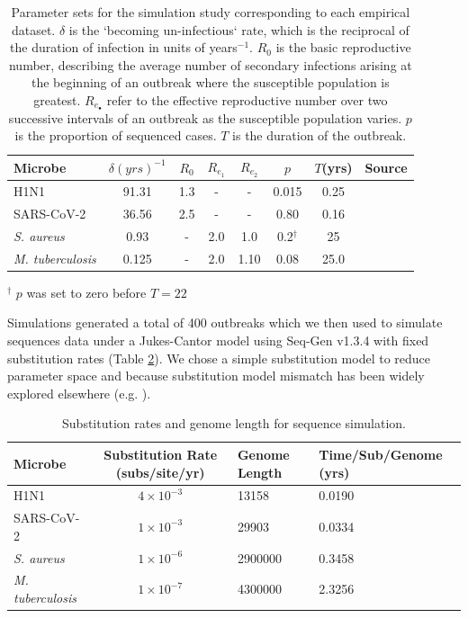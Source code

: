 \documentclass[12pt]{article}
\begin{document}
\begin{spacing}{2}
\begin{table}[H]
    \centering
    \caption{Parameter sets for the simulation study corresponding to each empirical dataset. $\delta$ is the `becoming un-infectious` rate, which is the reciprocal of the duration of infection in units of years$^{-1}$. $R_0$ is the basic reproductive number, describing the average number of secondary infections arising at the beginning of an outbreak where the susceptible population is greatest. $R_{e_\bullet}$ refer to the effective reproductive number over two successive intervals of an outbreak as the susceptible population varies. $p$ is the proportion of sequenced cases. $T$ is the duration of the outbreak.}
    \begin{tabular}{lccccccl}
    \toprule
    Microbe                     &   $\delta (yrs)^{-1}$    & $R_0$ &   $R_{e_1}$   &  $R_{e_2}$    &   $p$   &   $T$(yrs)   & Source \\
    \midrule
    H1N1                        &   91.31    & 1.3 &   -   &  -    &   0.015   &   0.25 & \citet{hedge_2013_real-time} \\
    SARS-CoV-2                  &   36.56    & 2.5 &   -   &  -   &   0.80   &  0.16 & \citet{lane2021genomics} \\
    \textit{S. aureus}    &   0.93    &  - &   2.0   &  1.0   &   0.2$^{\dagger}$   &   25 & \citet{duchene_2016_genome} \\
    \textit{M. tuberculosis}    &   0.125    &  - &   2.0   &  1.10    &   0.08   &   25.0 & \citet{kuhnert_tuberculosis_2018} \\
    \bottomrule
    \end{tabular}
    \label{tab:sim_parms}
\end{table}
\footnotesize
$^\dagger$ $p$ was set to zero before $T=22$
\normalsize

Simulations generated a total of 400 outbreaks which we then used to simulate sequences data under a Jukes-Cantor model using Seq-Gen v1.3.4 \citep{rambaut_seq-gen_1997} with fixed substitution rates (Table \ref{tab:seq_parms}). We chose a simple substitution model to reduce parameter space and because substitution model mismatch has been widely explored elsewhere (e.g. \citet{lemmon2004importance}).

\begin{table}[H]
    \centering
    \caption{Substitution rates and genome length for sequence simulation.}
    \begin{tabular}{lcll}
    \toprule
    Microbe                     &   Substitution Rate (subs/site/yr) & Genome Length & Time/Sub/Genome (yrs)  \\
    \midrule
    H1N1                        & $4\times10^{-3}$ & 13158 & 0.0190\\
    SARS-CoV-2                  & $1\times10^{-3}$ & 29903 & 0.0334\\
    \textit{S. aureus}    & $1\times10^{-6}$ & 2900000  & 0.3458\\
    \textit{M. tuberculosis}    &   $1\times10^{-7}$ & 4300000 & 2.3256\\
    \bottomrule
    \end{tabular}
    \label{tab:seq_parms}
\end{table}


\end{spacing}
\end{document}
